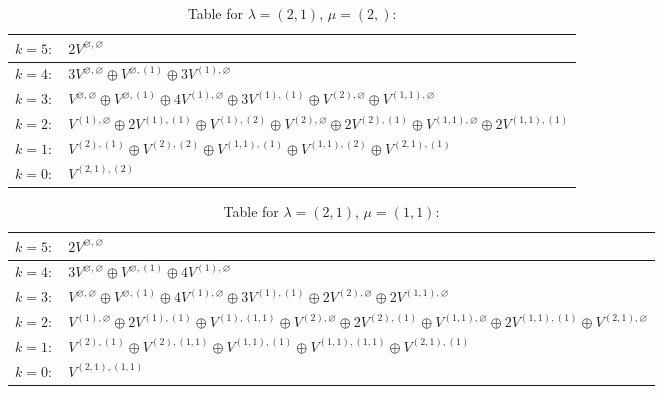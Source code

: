 \renewcommand{\arraystretch}{1.6} 
\begin{table}[H]
\centering
\caption{Table for $\lambda = (2, 1)$, $\mu = (2,)$:}
\begin{tabular}{|>{\centering\arraybackslash}p{15cm}|}
\hline
 $k = 5: \quad 2 V^{\varnothing, \varnothing} $ \\ \hline
 $k = 4: \quad 3 V^{\varnothing, \varnothing} \oplus V^{\varnothing, (1)} \oplus 3 V^{(1), \varnothing} $ \\ \hline
 $k = 3: \quad V^{\varnothing, \varnothing} \oplus V^{\varnothing, (1)} \oplus 4 V^{(1), \varnothing} \oplus 3 V^{(1), (1)} \oplus V^{(2), \varnothing} \oplus V^{(1, 1), \varnothing} $ \\ \hline
 $k = 2: \quad V^{(1), \varnothing} \oplus 2 V^{(1), (1)} \oplus V^{(1), (2)} \oplus V^{(2), \varnothing} \oplus 2 V^{(2), (1)} \oplus V^{(1, 1), \varnothing} \oplus 2 V^{(1, 1), (1)} $ \\ \hline
 $k = 1: \quad V^{(2), (1)} \oplus V^{(2), (2)} \oplus V^{(1, 1), (1)} \oplus V^{(1, 1), (2)} \oplus V^{(2, 1), (1)} $ \\ \hline
 $k = 0: \quad V^{(2, 1), (2)} $ \\ \hline
\end{tabular}
\end{table}

\renewcommand{\arraystretch}{1.6} 
\begin{table}[H]
\centering
\caption{Table for $\lambda = (2, 1)$, $\mu = (1, 1)$:}
\begin{tabular}{|>{\centering\arraybackslash}p{15cm}|}
\hline
 $k = 5: \quad 2 V^{\varnothing, \varnothing} $ \\ \hline
 $k = 4: \quad 3 V^{\varnothing, \varnothing} \oplus V^{\varnothing, (1)} \oplus 4 V^{(1), \varnothing} $ \\ \hline
 $k = 3: \quad V^{\varnothing, \varnothing} \oplus V^{\varnothing, (1)} \oplus 4 V^{(1), \varnothing} \oplus 3 V^{(1), (1)} \oplus 2 V^{(2), \varnothing} \oplus 2 V^{(1, 1), \varnothing} $ \\ \hline
 $k = 2: \quad V^{(1), \varnothing} \oplus 2 V^{(1), (1)} \oplus V^{(1), (1, 1)} \oplus V^{(2), \varnothing} \oplus 2 V^{(2), (1)} \oplus V^{(1, 1), \varnothing} \oplus 2 V^{(1, 1), (1)} \oplus V^{(2, 1), \varnothing} $ \\ \hline
 $k = 1: \quad V^{(2), (1)} \oplus V^{(2), (1, 1)} \oplus V^{(1, 1), (1)} \oplus V^{(1, 1), (1, 1)} \oplus V^{(2, 1), (1)} $ \\ \hline
 $k = 0: \quad V^{(2, 1), (1, 1)} $ \\ \hline
\end{tabular}
\end{table}

